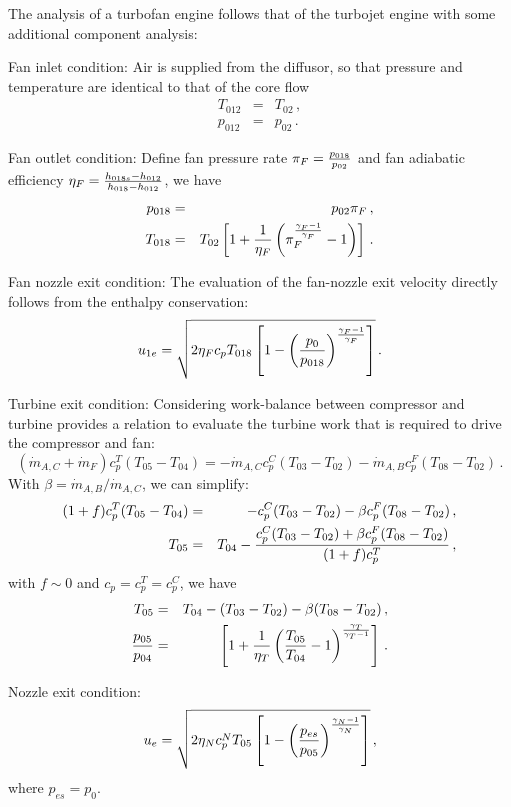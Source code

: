 The analysis of a turbofan engine follows that of the turbojet engine with some additional component analysis:
\begin{itemizePacked}
\item Fan inlet condition: Air is supplied from the diffusor, so that pressure and temperature are identical to that of the core flow
\begin{eqnarray}
T_{012} &=& T_{02}\,,\\
p_{012} &=& p_{02}\,.
\end{eqnarray}
\item Fan outlet condition: Define fan pressure rate $\pi_F = {\frac{p_{018}}{p_{02}}}$ and fan adiabatic efficiency $\eta_F = {\frac{h_{018s}-h_{012}}{h_{018}-h_{012}}}$, we have
\begin{eqnarray}
p_{018} &=& p_{02}\pi_F\,,\\
T_{018} &=& T_{02}\left[1+{\frac{1}{\eta_F}}\left(\pi_F^{\frac{\gamma_F-1}{\gamma_F}}-1\right)\right]\,.
\end{eqnarray}
\item Fan nozzle exit condition: The evaluation of the fan-nozzle exit velocity directly follows from the enthalpy conservation:
\begin{equation}
  u_{1e} = \sqrt{2\eta_F c_p T_{018} \left[1-\left({\frac{p_0}{p_{018}}}\right)^{\frac{\gamma_F-1}{\gamma_F}}\right]}\,.
\end{equation}
\item Turbine exit condition: Considering work-balance between compressor and turbine provides a relation to evaluate the turbine work that is required to drive the compressor and fan:
\begin{equation}
(\dot{m}_{A,C}+\dot{m}_F)c_p^T (T_{05}-T_{04}) = -\dot{m}_{A,C} c_p^C (T_{03}-T_{02}) -\dot{m}_{A,B} c_p^F (T_{08}-T_{02})\,.
\end{equation}
With $\beta = \dot{m}_{A,B}/\dot{m}_{A,C}$, we can simplify:
\begin{eqnarray}
(1+f) c_p^T (T_{05}-T_{04}) &=& - c_p^C (T_{03}-T_{02}) -\beta c_p^F (T_{08}-T_{02})\,,\\
T_{05} &=& T_{04} - {\frac{c_p^C(T_{03}-T_{02}) + \beta c_p^F (T_{08}-T_{02})}{(1+f)c_p^T}}\,,
\end{eqnarray}
with $f \sim 0$ and $c_p = c_p^T = c_p^C$, we have
\begin{eqnarray}
T_{05} &=& T_{04} - (T_{03}-T_{02})-\beta(T_{08}-T_{02})\,,\\
{\frac{p_{05}}{p_{04}}} &=& \left[1+{\frac{1}{\eta_T}}\left({\frac{T_{05}}{T_{04}}}-1\right)^{\frac{\gamma_T}{\gamma_T-1}}\right]\,.
\end{eqnarray}
\item Nozzle exit condition:
\[
  u_e = \sqrt{2 \eta_N c_p^N T_{05} \left[ 1 - \left({\frac{p_{es}}{p_{05}}}\right)^{\frac{\gamma_N-1}{\gamma_N}}\right]}\,,
\]
where $p_{es} = p_0$.
\end{itemizePacked}
